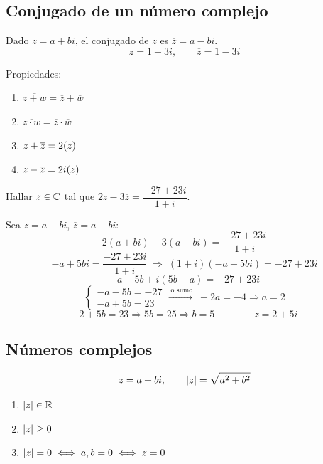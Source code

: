 \documentclass[11pt,a4paper]{article}
\let\Re\relax\DeclareMathOperator{\Re}{Re}
\let\Im\relax\DeclareMathOperator{\Im}{Im}
\begin{document}
\subsection{Conjugado de un número complejo}

\begin{definicion}
Dado $z=a+bi$, el conjugado de $z$ es $\overline{z}=a-bi$.
\[
z=1+3i,\qquad \overline{z}=1-3i
\]
\end{definicion}

Propiedades:
\begin{enumerate}[label=(\arabic*)]
  \item $\overline{z+w}=\overline{z}+\overline{w}$
  \item $\overline{z\cdot w}=\overline{z}\cdot\overline{w}$
  \item $z+\overline{z}=2\Re(z)$
  \item $z-\overline{z}=2i\Im(z)$
\end{enumerate}

\begin{ejercicio}
Hallar $z\in\mathbb{C}$ tal que $2z-3\overline{z}=\dfrac{-27+23i}{1+i}$.
\end{ejercicio}
\begin{solucion}
Sea $z=a+bi$, $\overline{z}=a-bi$:
\[
2(a+bi)-3(a-bi)=\frac{-27+23i}{1+i}
\]
\[
-a+5bi=\frac{-27+23i}{1+i}\;\Longrightarrow\;(1+i)(-a+5bi)=-27+23i
\]
\[
-a-5b+i(5b-a)=-27+23i
\]
\[
\begin{cases} -a-5b=-27\\ -a+5b=23\end{cases}
\xrightarrow{\text{lo sumo}}\; -2a=-4\Rightarrow \boxed{a=2}
\]
\[
-2+5b=23\Rightarrow 5b=25\Rightarrow\boxed{b=5}
\qquad\qquad
\boxed{z=2+5i}
\]
\end{solucion}


\subsection{Números complejos}

\[
z=a+bi,\qquad \lvert z\rvert=\sqrt{a^2+b^2}
\]

\begin{observacion}\leavevmode
\begin{enumerate}[label=\arabic*)]
  \item $\lvert z\rvert\in\mathbb{R}$
  \item $\lvert z\rvert\geq 0$
  \item $\lvert z\rvert=0\iff a,b=0\iff z=0$
\end{enumerate}
\end{observacion}
\end{document}
